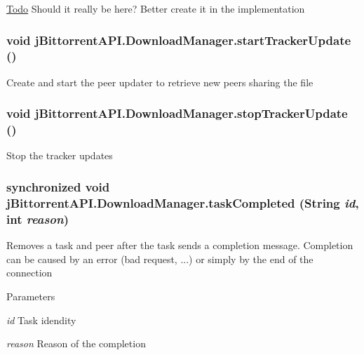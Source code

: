 \begin{Desc}
\item[\hyperlink{todo__todo000002}{Todo}]Should it really be here? Better create it in the implementation \end{Desc}
\hypertarget{classj_bittorrent_a_p_i_1_1_download_manager_a5d9bd7a64a0747d9440c5bcffc23e485}{
\subsubsection[{startTrackerUpdate}]{\setlength{\rightskip}{0pt plus 5cm}void jBittorrentAPI.DownloadManager.startTrackerUpdate ()}}
\label{classj_bittorrent_a_p_i_1_1_download_manager_a5d9bd7a64a0747d9440c5bcffc23e485}
Create and start the peer updater to retrieve new peers sharing the file \hypertarget{classj_bittorrent_a_p_i_1_1_download_manager_a6fe29d22cb0d273f57e4ae1889f482f9}{
\subsubsection[{stopTrackerUpdate}]{\setlength{\rightskip}{0pt plus 5cm}void jBittorrentAPI.DownloadManager.stopTrackerUpdate ()}}
\label{classj_bittorrent_a_p_i_1_1_download_manager_a6fe29d22cb0d273f57e4ae1889f482f9}
Stop the tracker updates \hypertarget{classj_bittorrent_a_p_i_1_1_download_manager_a1b52fff0ffb273927c74137371efaa6b}{
\subsubsection[{taskCompleted}]{\setlength{\rightskip}{0pt plus 5cm}synchronized void jBittorrentAPI.DownloadManager.taskCompleted (String {\em id}, \/  int {\em reason})}}
\label{classj_bittorrent_a_p_i_1_1_download_manager_a1b52fff0ffb273927c74137371efaa6b}
Removes a task and peer after the task sends a completion message. Completion can be caused by an error (bad request, ...) or simply by the end of the connection 
\begin{DoxyParams}{Parameters}
\item[{\em id}]Task idendity \item[{\em reason}]Reason of the completion \end{DoxyParams}


